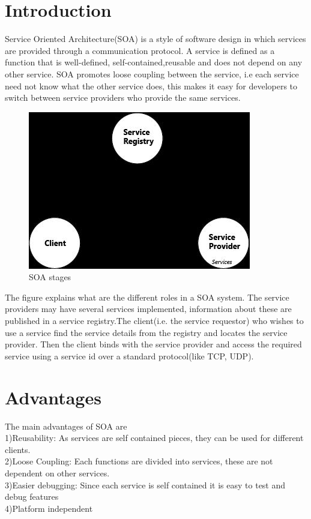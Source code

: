 \documentclass{fisattraining}
\begin{document}
\section{Introduction}
Service Oriented Architecture(SOA) is a style of software design in which  services are provided through a communication protocol. A service is defined as a function that is  well-defined, self-contained,reusable and does not depend on any other service. SOA promotes loose coupling between the service, i.e each service need not know what the other service does, this makes it easy for developers to switch between service providers who provide the same services.
\begin{figure}[h!]
\begin{center}
\includegraphics[scale=.2]{soastages}
\caption{SOA stages}
\end{center}
\end{figure}
The figure explains what are the different roles in a SOA system. The service providers may have several services implemented, information about these are  published in a service registry.The client(i.e. the service requestor) who wishes to use a service find the service details from the registry and locates the service provider. Then the client binds with the service provider and access the required service using a service id over a standard protocol(like TCP, UDP).
\section{Advantages}
The main advantages of SOA are\\
  1)Reusability: As services are self contained pieces, they can be used for different clients.\\
  2)Loose Coupling: Each functions are divided into services, these are not dependent on other services.\\
  3)Easier debugging: Since each service is self contained it is easy to test and debug features\\
  4)Platform independent
\end{document}
